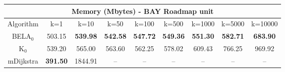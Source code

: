 \begin{tabular}{c|cccccccc}\toprule
\multicolumn{9}{c}{Memory (Mbytes) - BAY Roadmap unit}\\ \midrule
Algorithm & k=1 & k=10 & k=50 & k=100 & k=500 & k=1000 & k=5000 & k=10000 \\ \midrule
BELA$_0$ & 503.15 & \textbf{539.98} & \textbf{542.58} & \textbf{547.72} & \textbf{549.36} & \textbf{551.30} & \textbf{582.71} & \textbf{683.90} \\
K$_0$ & 539.20 & 565.00 & 563.60 & 562.25 & 578.02 & 609.43 & 766.25 & 969.92 \\
mDijkstra & \textbf{391.50} & 1844.91 & -- & -- & -- & -- & -- & -- \\ \bottomrule 
\end{tabular}
